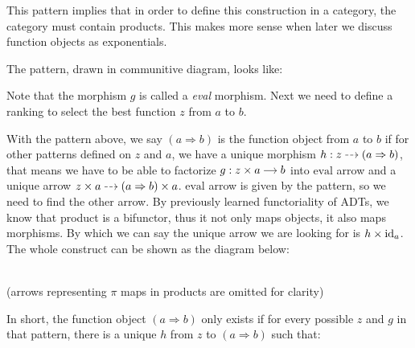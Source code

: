 This pattern implies that in order to define this construction in a category,
the category must contain products. This makes more sense when later we discuss
function objects as exponentials.

The pattern, drawn in communitive diagram, looks like:

\begin{center}
\end{center}

Note that the morphism $g$ is called a \emph{eval} morphism. Next we need to
define a ranking to select the best function $z$ from $a$ to $b$.

\newcommand{\arb}{\ensuremath{}(a\Rightarrow{}b)}

With the pattern above, we say $\arb$ is the function object from $a$ to $b$ if
for other patterns defined on $z$ and $a$, we have a unique morphism $h:
\cd{z\rar[dashed] \& \arb}$, that means we have to be able to factorize
$g:\cd{z\times a\rar\& b}$ into $\textrm{eval}$ arrow and a unique arrow
$\cd{z\times a\rar[dashed] \&\arb\times a}$. $\textrm{eval}$ arrow is given by
the pattern, so we need to find the other arrow. By previously learned
functoriality of ADTs, we know that product is a bifunctor, thus it not only
maps objects, it also maps morphisms. By which we can say the unique arrow we
are looking for is $h\times \mathrm{id}_a$. The whole construct can be shown as the
diagram below:

\begin{center}
  \\
  (arrows representing $\pi$ maps in products are omitted for clarity)
\end{center}


In short, the function object $\arb$ only exists if for every possible $z$ and
$g$ in that pattern, there is a unique $h$ from $z$ to $\arb$ such that:

